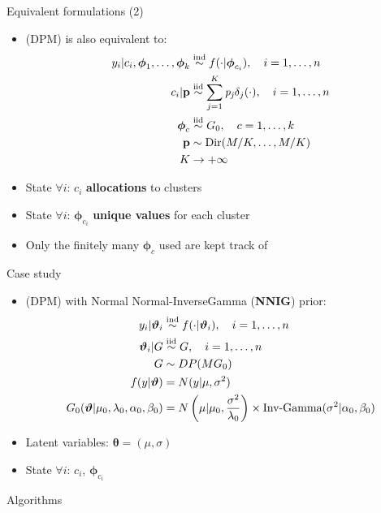 \begin{frame}{Equivalent formulations (2)} %
	\begin{itemize}
		\item (DPM) is also equivalent to:
		\begin{align*}
		y_{i}|c_i,\boldsymbol\phi_1,\dots,\boldsymbol\phi_k &\stackrel{\text{ind}}{\sim} f(\cdot|\boldsymbol\phi_{c_{i}}), \quad i=1,\dots,n \\
		c_{i}|\mathit{\mathbf{p}}&\stackrel{\text{iid}}{\sim} \sum_{j=1}^K\mathit{p_j} \delta_j(\cdot), \quad i=1,\dots,n \\
		\boldsymbol\phi_{c} & \stackrel{\text{iid}}{\sim} G_{0}, \quad c=1,\dots,k \\
		\mathbf{p} &\sim \operatorname{Dir}(M/K,\dots,M/K) \\
		K &\to +\infty
		\end{align*}
		\item State $\forall i$: $c_i$ \textbf{allocations} to clusters
		\item State $\forall i$: $\boldsymbol\phi_{c_i}$ \textbf{unique values} for each cluster
		\item Only the finitely many $\boldsymbol\phi_{c}$ used are kept track of
	\end{itemize}
\end{frame}


\begin{frame}{Case study} %
	\begin{itemize}
		\item (DPM) with Normal Normal-InverseGamma (\textbf{NNIG}) prior:
		\begin{align*}
		y_i | \boldsymbol{\vartheta}_i &\stackrel{\text{ind}}{\sim} f(\cdot|\boldsymbol{\vartheta}_i), \quad i=1,\dots,n \\
		\boldsymbol{\vartheta}_i | G &\stackrel{\text{iid}}{\sim} G, \quad i=1,\dots,n \\ 
		G &\sim DP(M G_0) \\
		f(y|\boldsymbol{\vartheta})&=N(y| \mu ,\sigma^2)  \\
		G_0(\boldsymbol{\vartheta}|\mu_0,\lambda_0, \alpha_0, 	\beta_0)
		&=N\left(\mu | \mu_0 ,\frac{\sigma^2} {\lambda_0}\right) \times \text{Inv-Gamma}(\sigma^2|\alpha_0, \beta_0 )
		\end{align*}
		\item Latent variables: $\boldsymbol\theta = (\mu,\sigma)$
		\item State $\forall i$: $c_i$, $\boldsymbol\phi_{c_i}$
	\end{itemize}
\end{frame}


\begin{frame}[c] %
	\begin{center}
		\huge \color{blue} Algorithms
	\end{center}
\end{frame}


